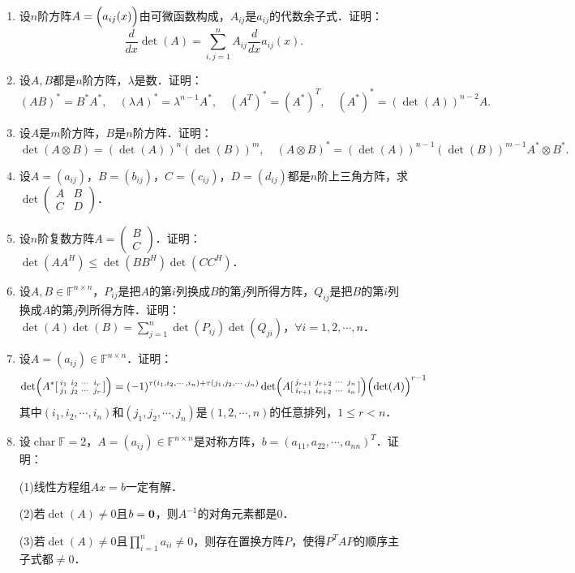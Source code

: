 \documentclass[a4paper,fontset=windows]{ctexbook}
\theoremstyle{definition}
\DeclareMathOperator{\Char}{char}
\renewcommand{\le}{\leqslant}
\begin{document}
\begin{enumerate}
(3)（Cayley公式）$(nI_n-J)^*=n^{n-2}J$．

\item 设$n$阶方阵$A=\Bigl(a_{ij}(x)\Bigr)$由可微函数构成，$A_{ij}$是$a_{ij}$的代数余子式．证明：$$\frac{d}{dx}\det(A)=\sum_{i,j=1}^nA_{ij}\frac{d}{dx}a_{ij}(x).$$

\item 设$A,B$都是$n$阶方阵，$\lambda$是数．证明：
$$(AB)^*=B^*A^*,\quad(\lambda A)^*=\lambda^{n-1}A^*,\quad
(A^T)^*=(A^*)^T,\quad(A^*)^*=(\det(A))^{n-2}A.$$

\item 设$A$是$m$阶方阵，$B$是$n$阶方阵．证明：
$$\det(A\otimes B)=(\det(A))^n(\det(B))^m,\quad
(A\otimes B)^*=(\det(A))^{n-1}(\det(B))^{m-1}A^*\otimes B^*.$$

\item 设$A=(a_{ij})$，$B=(b_{ij})$，$C=(c_{ij})$，$D=(d_{ij})$都是$n$阶上三角方阵，求$\det\begin{pmatrix}A&B \\ C&D\end{pmatrix}$．

\item 设$n$阶复数方阵$A=\begin{pmatrix}B \\ C\end{pmatrix}$．证明：$\det(AA^H)\le\det(BB^H)\det(CC^H)$．

\item 设$A,B\in\mathbb{F}^{n\times n}$，$P_{ij}$是把$A$的第$i$列换成$B$的第$j$列所得方阵，$Q_{ij}$是把$B$的第$i$列换成$A$的第$j$列所得方阵．证明：$\det(A)\det(B)=\sum\limits_{j=1}^n\det(P_{ij})\det(Q_{ji})$，$\forall i=1,2,\cdots,n$．

\item 设$A=(a_{ij})\in\mathbb{F}^{n\times n}$．证明：
$$\det\Bigl(A^*[\begin{smallmatrix}i_1&i_2&\cdots&i_r \\ j_1&j_2&\cdots&j_r\end{smallmatrix}]\Bigr)=(-1)^{\tau(i_1,i_2,\cdots,i_n)+\tau(j_1,j_2,\cdots,j_n)}\det\Bigl(A[\begin{smallmatrix}j_{r+1}&j_{r+2}&\cdots&j_n \\ i_{r+1}&i_{r+2}&\cdots&i_n\end{smallmatrix}]\Bigr)\Bigl(\det(A)\Bigr)^{r-1}$$
其中$(i_1,i_2,\cdots,i_n)$和$(j_1,j_2,\cdots,j_n)$是$(1,2,\cdots,n)$的任意排列，$1\le r<n$．

\item 设$\Char\mathbb{F}=2$，$A=(a_{ij})\in\mathbb{F}^{n\times n}$是对称方阵，$b=(a_{11},a_{22},\cdots,a_{nn})^T$．证明：

(1)线性方程组$Ax=b$一定有解．

(2)若$\det(A)\ne 0$且$b={\bf 0}$，则$A^{-1}$的对角元素都是0．

(3)若$\det(A)\ne 0$且$\prod\limits_{i=1}^na_{ii}\ne 0$，则存在置换方阵$P$，使得$P^TAP$的顺序主子式都$\ne 0$．

\end{enumerate}
\end{document}

